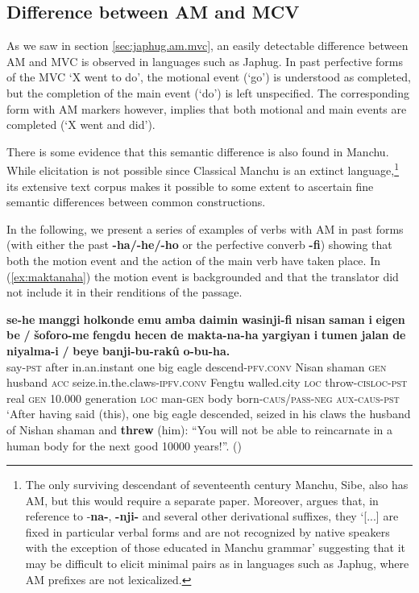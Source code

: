 \documentclass{article}
\newcommand{\ipa}[1]{\textbf{{\phon\mbox{#1}}}} %
\begin{document}
\subsection{Difference between AM and MCV} \label{sec:mvc.manchu}
As we saw in section \ref{sec:japhug.am.mvc}, an easily detectable difference between AM and MVC is observed in languages such as Japhug. In past perfective forms of the MVC ‘X went to do’, the motional event (‘go’) is understood as completed, but the completion of the main event (‘do’) is left unspecified. The corresponding form with AM markers however, implies that both motional and main events are completed (‘X went and did’). 


There is some evidence that this semantic difference is also found in Manchu. While elicitation is not possible since Classical Manchu is an extinct language,\footnote{The only surviving descendant of seventeenth century Manchu, Sibe, also has AM, but this would require a separate paper. Moreover, \citet[178]{zikmundova13sibe} argues that, in reference to -\ipa{na-}, \ipa{-nji-} and several other derivational suffixes, they `[...] are fixed in particular verbal forms and are not recognized by native speakers with the exception of those educated in Manchu grammar' suggesting that it may be difficult to elicit minimal pairs as in languages such as Japhug, where AM prefixes are not lexicalized. } its extensive text corpus makes it possible to some extent to ascertain fine semantic differences between common constructions.

In the following, we present a series of examples of verbs with AM in past forms (with either the past \ipa{-ha/-he/-ho} or the perfective converb \ipa{-fi}) showing that both the motion event and the action of the main verb have taken place. In (\ref{ex:maktanaha}) the motion event is backgrounded and that the translator did not include it in their renditions of the passage.

\begin{exe}
\ex  \label{ex:maktanaha}
\gll
\ipa{se-he} 	\ipa{manggi} 	\ipa{holkonde} 	\ipa{emu} 	\ipa{amba} 	\ipa{daimin} 	\ipa{wasinji-fi} 	\ipa{nisan} 	\ipa{saman} 	\ipa{i} 	\ipa{eigen} 	\ipa{be} 	\ipa{/} 	\ipa{šoforo-me} 	\ipa{fengdu} 	\ipa{hecen} 	\ipa{de} 	\ipa{makta-na-ha} 	\ipa{yargiyan} 	\ipa{i} 	\ipa{tumen} 	\ipa{jalan} 	\ipa{de} 	\ipa{niyalma-i} 	\ipa{/} 	\ipa{beye} 	\ipa{banji-bu-rakû} 	\ipa{o-bu-ha.} \\
say-\textsc{pst} after in.an.instant one big eagle descend-\textsc{pfv.conv} Nisan shaman \textsc{gen} husband \textsc{acc} { } seize.in.the.claws-\textsc{ipfv.conv} Fengtu walled.city \textsc{loc} throw-\textsc{cisloc-pst} real \textsc{gen} 10.000 generation \textsc{loc} man-\textsc{gen} { } body born-\textsc{caus/pass-neg} \textsc{aux-caus-pst} \\
\glt `After having said (this), one big eagle descended, seized in his claws the husband of Nishan shaman and \textbf{threw} (him): “You will not be able to reincarnate in a human body for the next good 10000 years!”. (\citealt[85,20b/119]{jaxontov93nisan})
\end{exe}
\end{document}
